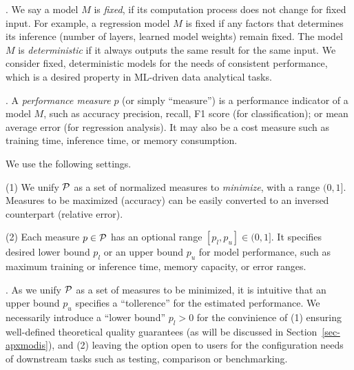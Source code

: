
. 
We say a model $M$ is {\em fixed}, if 
its computation process does not change  
for fixed input. 
For example, a regression model 
$M$ is fixed if any factors 
that determines its inference   
(\eg  number of layers, learned model 
weights) remain fixed. 
The model $M$ is {\em deterministic} 
if it always outputs the same result 
for the same input. 
We consider fixed, deterministic models for the needs of 
consistent performance, which is a 
desired property in ML-driven data analytical tasks. 

\vspace{.5ex}
. 
A {\em performance measure} $p$ (or simply ``measure'')
is a performance indicator of a model $M$, such as accuracy 
\eg precision, recall, F1 score (for classification); 
or mean average error (for regression analysis). 
It may also be a %
cost measure such as 
training time, 
inference time, or memory consumption. 



\vspace{.5ex}
We use the following settings.

\sstab
(1) We unify $\P$ as a set of normalized measures to {\em minimize}, with a range $(0,1]$. 
Measures to be maximized (\eg accuracy)  
can be easily converted to an inversed counterpart (\eg relative error).

\sstab
(2) Each measure $p\in \P$ has 
an optional range $[p_l, p_u]\in (0, 1]$. 
It specifies desired 
lower bound $p_l$ or an upper bound $p_u$ for model 
performance, such as 
maximum training or inference time, memory capacity, 
or error ranges. 

. 
As we unify $\P$ as a set of measures to be minimized, it is intuitive that an upper bound $p_u$ specifies a ``tollerence'' for the estimated performance. 
We necessarily introduce a ``lower bound'' $p_l > 0$ 
for the convinience of (1) ensuring well-defined theoretical 
quality guarantees (as will be discussed 
in Section~\ref{sec-apxmodis}), and (2) leaving the option 
open to users for the configuration needs of downstream tasks such as testing, comparison or benchmarking. 


